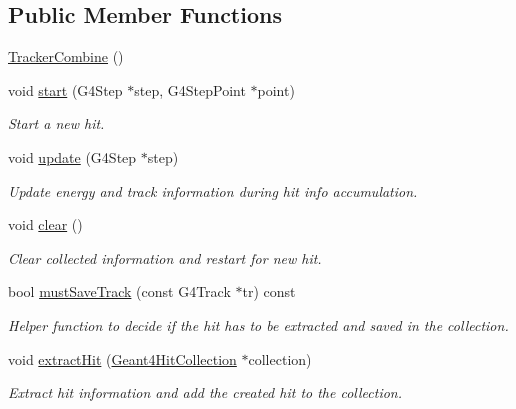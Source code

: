 \subsection*{Public Member Functions}
\begin{DoxyCompactItemize}
\item 
\hyperlink{struct_d_d4hep_1_1_simulation_1_1_tracker_combine_a60747607cdefc8283d864c6f5313a392}{TrackerCombine} ()
\item 
void \hyperlink{struct_d_d4hep_1_1_simulation_1_1_tracker_combine_a104188fb9a41662e03eacc2d34e4bced}{start} (G4Step $\ast$step, G4StepPoint $\ast$point)
\begin{DoxyCompactList}\small\item\em Start a new hit. \item\end{DoxyCompactList}\item 
void \hyperlink{struct_d_d4hep_1_1_simulation_1_1_tracker_combine_a3bd30148dcc0b7fa917b000c9946e77f}{update} (G4Step $\ast$step)
\begin{DoxyCompactList}\small\item\em Update energy and track information during hit info accumulation. \item\end{DoxyCompactList}\item 
void \hyperlink{struct_d_d4hep_1_1_simulation_1_1_tracker_combine_a7b178cd57d961437d3cfabb65d9c2d09}{clear} ()
\begin{DoxyCompactList}\small\item\em Clear collected information and restart for new hit. \item\end{DoxyCompactList}\item 
bool \hyperlink{struct_d_d4hep_1_1_simulation_1_1_tracker_combine_a063b82a781184cc0fbf21c0876a6acd6}{mustSaveTrack} (const G4Track $\ast$tr) const 
\begin{DoxyCompactList}\small\item\em Helper function to decide if the hit has to be extracted and saved in the collection. \item\end{DoxyCompactList}\item 
void \hyperlink{struct_d_d4hep_1_1_simulation_1_1_tracker_combine_a75803adf3212ecca99d2b6fbcd53899f}{extractHit} (\hyperlink{class_d_d4hep_1_1_simulation_1_1_geant4_hit_collection}{Geant4HitCollection} $\ast$collection)
\begin{DoxyCompactList}\small\item\em Extract hit information and add the created hit to the collection. \item\end{DoxyCompactList}\item 

\end{DoxyCompactItemize}
